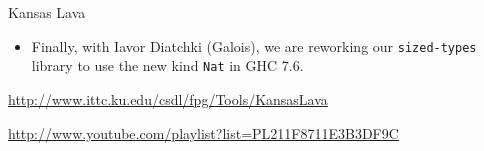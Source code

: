 \begin{hcarentry}{Kansas Lava}
\begin{itemize}
\item Finally, with Iavor Diatchki (Galois), we are reworking our {\tt sized-types\/}
library to use the new kind {\tt Nat} in GHC 7.6.
\end{itemize}

\FurtherReading
\begin{compactitem}
\item
  \url{http://www.ittc.ku.edu/csdl/fpg/Tools/KansasLava}\\
\item
  \url{http://www.youtube.com/playlist?list=PL211F8711E3B3DF9C}  
\end{compactitem}
\end{hcarentry}
